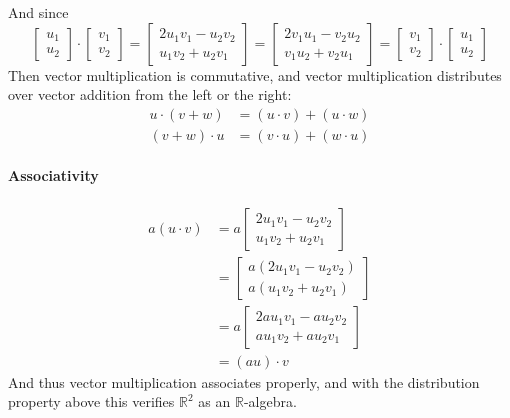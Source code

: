 \documentclass{article}
\begin{document}
\begin{solution}
And since 
\[ 
\begin{bmatrix}
u_{1}	\\
u_{2}
\end{bmatrix}
\cdot
\begin{bmatrix}
v_{1}	\\
v_{2}
\end{bmatrix}
=
\begin{bmatrix}
2u_{1}v_{1} - u_{2}v_{2}	\\
u_{1}v_{2} + u_{2}v_{1}
\end{bmatrix}
=
\begin{bmatrix}
2v_{1}u_{1} - v_{2}u_{2}	\\
v_{1}u_{2} + v_{2}u_{1}
\end{bmatrix}
=
\begin{bmatrix}
v_{1}	\\
v_{2}
\end{bmatrix}
\cdot
\begin{bmatrix}
u_{1}	\\
u_{2}
\end{bmatrix}
\]
Then vector multiplication is commutative, and vector multiplication distributes over vector addition from the left or the right:
\begin{align*}
u\cdot(v+w) &= (u\cdot v) + (u\cdot w)	\\
(v+w)\cdot u &= (v\cdot u) + (w\cdot u)
\end{align*}

\paragraph{Associativity}
\begin{align*}
a(u\cdot v) &= a
\begin{bmatrix}
2u_{1}v_{1} - u_{2}v_{2}	\\
u_{1}v_{2} + u_{2}v_{1}
\end{bmatrix}
\\
&= 
\begin{bmatrix}
a(2u_{1}v_{1} - u_{2}v_{2})	\\
a(u_{1}v_{2} + u_{2}v_{1})
\end{bmatrix}
\\
&= a
\begin{bmatrix}
2au_{1}v_{1} - au_{2}v_{2}	\\
au_{1}v_{2} + au_{2}v_{1}
\end{bmatrix}
\\
&= (au)\cdot v
\end{align*}
And thus vector multiplication associates properly, and with the distribution property above this verifies $\mathbb{R}^{2}$ as an $\mathbb{R}$-algebra.
\end{solution}
\end{document}

